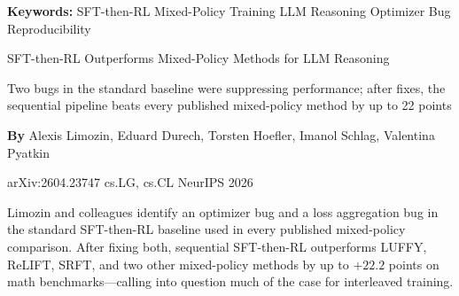 \documentclass[10pt,twocolumn]{article}
\begin{document}
\setlength{\parindent}{0pt}
\setlength{\parskip}{4pt}

{\small\color{keywordgray}\textbf{Keywords:}
  SFT-then-RL \textbullet{} Mixed-Policy Training \textbullet{} LLM Reasoning \textbullet{} Optimizer Bug \textbullet{} Reproducibility}\par\vspace{4pt}

{\LARGE\bfseries\raggedright SFT-then-RL Outperforms Mixed-Policy Methods for LLM Reasoning}\par\vspace{4pt}
{\large\itshape\raggedright Two bugs in the standard baseline were suppressing performance; after fixes, the sequential pipeline beats every published mixed-policy method by up to 22 points}\par\vspace{6pt}
{\small\textbf{By} Alexis Limozin, Eduard Durech, Torsten Hoefler, Imanol Schlag, Valentina Pyatkin}\par\vspace{2pt}
{\small\color{keywordgray}arXiv:2604.23747 \textbullet{} cs.LG, cs.CL \textbullet{} NeurIPS 2026}
\par\vspace{2pt}\noindent{\color{rulered}\rule{\columnwidth}{0.6pt}}\vspace{6pt}

Limozin and colleagues identify an optimizer bug and a loss aggregation bug in the standard SFT-then-RL baseline used in every published mixed-policy comparison.
After fixing both, sequential SFT-then-RL outperforms LUFFY, ReLIFT, SRFT, and two other mixed-policy methods by up to $+22.2$ points on math benchmarks---calling into question much of the case for interleaved training.
\end{document}
